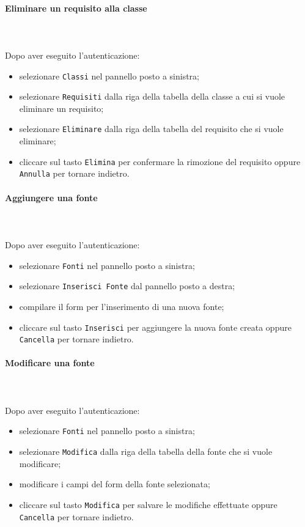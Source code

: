 	\paragraph{Eliminare un requisito alla classe} \mbox{}\\ \mbox{}\\
	Dopo aver eseguito l'autenticazione:
	\begin{itemize}
		\item selezionare \texttt{Classi} nel pannello posto a sinistra;
		\item selezionare \texttt{Requisiti} dalla riga della tabella della classe
		a cui si vuole eliminare un requisito;\
		\item selezionare \texttt{Eliminare} dalla riga della tabella del requisito
		che si vuole eliminare;
		\item cliccare sul tasto \texttt{Elimina} per confermare la rimozione del requisito
		oppure \texttt{Annulla} per tornare indietro.
	\end{itemize}
	
	\paragraph{Aggiungere una fonte} \mbox{}\\ \mbox{}\\
	Dopo aver eseguito l'autenticazione:
	\begin{itemize}
		\item selezionare \texttt{Fonti} nel pannello posto a sinistra;
		\item selezionare \texttt{Inserisci Fonte} dal pannello posto a destra;
		\item compilare il form per l'inserimento di una nuova fonte;
		\item cliccare sul tasto \texttt{Inserisci} per aggiungere la nuova fonte 
		creata oppure \texttt{Cancella} per tornare indietro.	
	\end{itemize}
	
	\paragraph{Modificare una fonte} \mbox{}\\ \mbox{}\\
	Dopo aver eseguito l'autenticazione:
	\begin{itemize}
		\item selezionare \texttt{Fonti} nel pannello posto a sinistra;
		\item selezionare \texttt{Modifica} dalla riga della tabella della fonte
		che si vuole modificare;
		\item modificare i campi del form della fonte selezionata;
		\item cliccare sul tasto \texttt{Modifica} per salvare le modifiche effettuate
		oppure \texttt{Cancella} per tornare indietro.
	\end{itemize}
	
